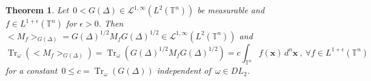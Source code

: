 \documentclass[final,1p]{elsarticle}
\numberwithin{equation}{section}
\theoremstyle{plain}
\newtheorem{thm}{Theorem}[section]
\theoremstyle{definition}
\begin{document}
\begin{thm}
  \label{TCLonePlusEpsilon}
  Let~$0 < G(\Delta) \in \mathcal{L}^{1, \infty}(L^2({\ensuremath{\mathbb{T}}}^n))$ be measurable
  and~$f \in L^{1 + \epsilon} ({\ensuremath{\mathbb{T}}}^n)$ for $\epsilon > 0$.  Then~${\ensuremath{\big< {M_f} \big>_{{G(\Delta)}}}} = G(\Delta)^{1/2}
  M_f G(\Delta)^{1/2} \in \mathcal{L}^{1, \infty}(L^2({\ensuremath{\mathbb{T}}}^n))$ and
 $$
\operatorname{Tr}_\omega ({\ensuremath{\big< {M_f} \big>_{{G(\Delta)}}}}) =  \operatorname{Tr}_\omega (G(\Delta)^{1/2} M_f
  G(\Delta)^{1/2}) = c \int_{{\ensuremath{\mathbb{T}}}^n} f(\mathbf{x}) \, d^n \mathbf{x} \ , \ {\ensuremath{\forall}} f \in L^{1+\epsilon}({\ensuremath{\mathbb{T}}}^n)
 $$ for a constant~$ 0 \leq c =
  \operatorname{Tr}_\omega (G(\Delta))$ independent of~$\omega \in DL_2$.
\end{thm}
\end{document}
